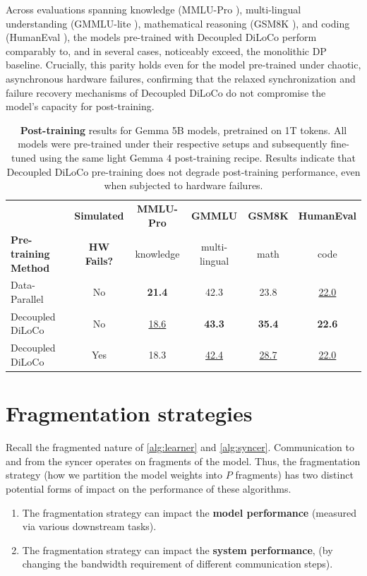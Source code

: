 \documentclass[11pt, a4paper, twocolumn, copyright, google]{google}
\begin{document}
Across evaluations spanning knowledge (MMLU-Pro \citep{wang2024mmluprorobustchallengingmultitask}), multi-lingual understanding (GMMLU-lite \citep{singh2024globalmmluunderstandingaddressing}), mathematical reasoning (GSM8K \citep{cobbe2021gsm8k}), and coding (HumanEval \citep{chen2021codex}), the models pre-trained with Decoupled DiLoCo perform comparably to, and in several cases, noticeably exceed, the monolithic DP baseline. Crucially, this parity holds even for the model pre-trained under chaotic, asynchronous hardware failures, confirming that the relaxed synchronization and failure recovery mechanisms of Decoupled DiLoCo do not compromise the model's capacity for post-training.

\begin{table}[htbp]
\centering
\begin{tabular}{l c cccc}
\toprule
 & \textbf{Simulated} & \textbf{MMLU-Pro} & \textbf{GMMLU} & \textbf{GSM8K} & \textbf{HumanEval} \\
\textbf{Pre-training Method} & \textbf{HW Fails?} &
{\scriptsize\color{gray} knowledge} &
{\scriptsize\color{gray} multi-lingual} &
{\scriptsize\color{gray} math} &
{\scriptsize\color{gray} code} \\
\midrule
Data-Parallel     & No  & \textbf{21.4} & 42.3 & 23.8 & \underline{22.0} \\
Decoupled DiLoCo  & No  & \underline{18.6} & \textbf{43.3} & \textbf{35.4} & \textbf{22.6} \\
Decoupled DiLoCo  & Yes & 18.3 & \underline{42.4} & \underline{28.7} & \underline{22.0} \\
\bottomrule
\end{tabular}
\vspace{2mm}
\caption{\textbf{Post-training} results for Gemma 5B models, pretrained on 1T tokens. All models were pre-trained under their respective setups and subsequently fine-tuned using the same light Gemma 4 post-training recipe. Results indicate that Decoupled DiLoCo pre-training does not degrade post-training performance, even when subjected to hardware failures.}
\label{tab:post_training}
\end{table}


\section{Fragmentation strategies}\label{sec:fragmentation_ablations}

Recall the fragmented nature of \autoref{alg:learner} and \autoref{alg:syncer}. Communication to and from the syncer operates on fragments of the model. Thus, the fragmentation strategy (how we partition the model weights into $P$ fragments) has two distinct potential forms of impact on the performance of these algorithms.
\begin{enumerate}
    \item The fragmentation strategy can impact the \textbf{model performance} (measured via various downstream tasks).
    \item The fragmentation strategy can impact the \textbf{system performance}, (by changing the bandwidth requirement of different communication steps).
\end{enumerate}
\end{document}
